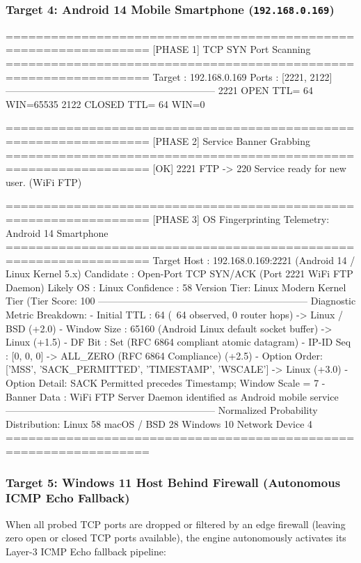 \subsubsection{Target 4: Android 14 Mobile Smartphone (\texttt{192.168.0.169})}
\begin{logbox}
=================================================================
  [PHASE 1] TCP SYN Port Scanning
=================================================================
  Target      : 192.168.0.169
  Ports       : [2221, 2122]
-----------------------------------------------------------------
   2221  OPEN                           TTL= 64 WIN=65535
   2122  CLOSED                         TTL= 64 WIN=0

=================================================================
  [PHASE 2] Service Banner Grabbing
=================================================================
  [OK] 2221  FTP      -> 220 Service ready for new user. (WiFi FTP)

=================================================================
  [PHASE 3] OS Fingerprinting Telemetry: Android 14 Smartphone
=================================================================
  Target Host : 192.168.0.169:2221 (Android 14 / Linux Kernel 5.x)
  Candidate   : Open-Port TCP SYN/ACK (Port 2221 WiFi FTP Daemon)
  Likely OS   : Linux                   Confidence : 58%
  Version Tier: Linux Modern Kernel Tier (Tier Score: 100%
-----------------------------------------------------------------
  Diagnostic Metric Breakdown:
    - Initial TTL : 64 (~64 observed, 0 router hops) -> Linux / BSD (+2.0)
    - Window Size : 65160 (Android Linux default socket buffer) -> Linux (+1.5)
    - DF Bit      : Set (RFC 6864 compliant atomic datagram)
    - IP-ID Seq   : [0, 0, 0] -> ALL_ZERO (RFC 6864 Compliance) (+2.5)
    - Option Order: ['MSS', 'SACK_PERMITTED', 'TIMESTAMP', 'WSCALE'] -> Linux (+3.0)
    - Option Detail: SACK Permitted precedes Timestamp; Window Scale = 7
    - Banner Data : WiFi FTP Server Daemon identified as Android mobile service
-----------------------------------------------------------------
  Normalized Probability Distribution:
    Linux             58%
    macOS / BSD       28%
    Windows           10%
    Network Device     4%
=================================================================
\end{logbox}

\subsubsection{Target 5: Windows 11 Host Behind Firewall (Autonomous ICMP Echo Fallback)}
When all probed TCP ports are dropped or filtered by an edge firewall (leaving zero open or closed TCP ports available), the engine autonomously activates its Layer-3 ICMP Echo fallback pipeline:

